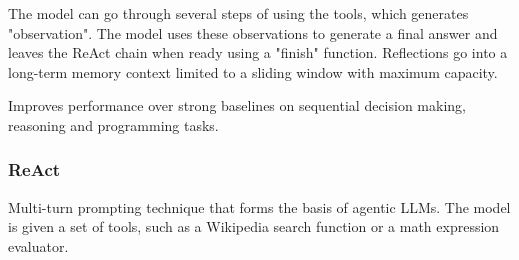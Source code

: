 The model can go through several steps of using the tools, which generates "observation". The model uses these observations to generate a final answer and leaves the ReAct chain when ready using a "finish" function.
Reflections go into a long-term memory context limited to a sliding window with maximum capacity. \cite{shinn2023reflexionlanguageagentsverbal}

Improves performance over strong baselines on sequential decision making, reasoning and programming tasks. \cite{shinn2023reflexionlanguageagentsverbal}
\subsubsection{ReAct}
Multi-turn prompting technique that forms the basis of agentic LLMs. The model is given a set of tools, such as a Wikipedia search function or a math expression evaluator.


